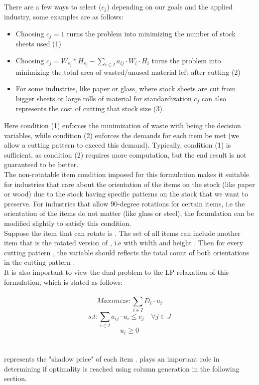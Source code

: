 \documentclass[a4paper]{article}
\begin{document}
    \vspace{0.2cm}\\
    There are a few ways to select \boldmath($c_j$) depending on our goals and the applied industry, some examples are as follows:
    \begin{itemize}
        \item Choosing \( c_j = 1\) turns the problem into minimizing the number of stock sheets used (1)
        \item Choosing \( c_j = W_{s_j} * H_{s_j} - \sum_{i \in I} a_{ij} \cdot W_i \cdot H_i   \)  turns the problem into minimizing the total area of wasted/unused material left after cutting (2)
        \item For some industries, like paper or glass, where stock sheets are cut from bigger sheets or large rolls of material for standardization \( c_j \)  can also represents the cost of cutting that stock size (3). 
    \end{itemize}

    \noindent
    Here condition (1) enforces the minimization of waste with  being the decision variables, 
    while condition (2) enforces the demands for each item be met (we allow a cutting pattern to exceed this demand). Typically, condition (1) is sufficient, as condition (2) requires more computation, but the end result is not guaranteed to be better. 
    \vspace{0.2cm}\\
    The non-rotatable item condition imposed for this formulation makes it suitable for industries that care about the orientation of the items on the stock (like paper or wood) due to the stock having specific patterns on the stock that we want to preserve. For industries that allow 90-degree rotations for certain items, i.e the orientation of the items do not matter (like glass or steel), the formulation can be modified slightly to satisfy this condition.
    \vspace{0.2cm}\\    
    Suppose the item that can rotate is .
    The set of all items  can include another item that is the rotated version of , i.e with width  and height . Then for every cutting pattern , the variable  should reflects the total count of both orientations in the cutting pattern . 
    \vspace{0.2cm}\\
    It is also important to view the dual problem to the LP relaxation of this formulation, which is stated as follows:
    \\ \\
    \[ Maximize: \sum_{i \in I} D_i \cdot u_i\]
    \[ s.t:  \sum_{i \in I} a_{ij} \cdot u_i \leqslant c_j \quad \forall j \in J\]
    \[  u_i \geqslant 0 \]
    \\ \\
     represents the "shadow price" of each item .  plays an important role in determining if optimality is reached using column generation in the following section.
    
\end{document}
